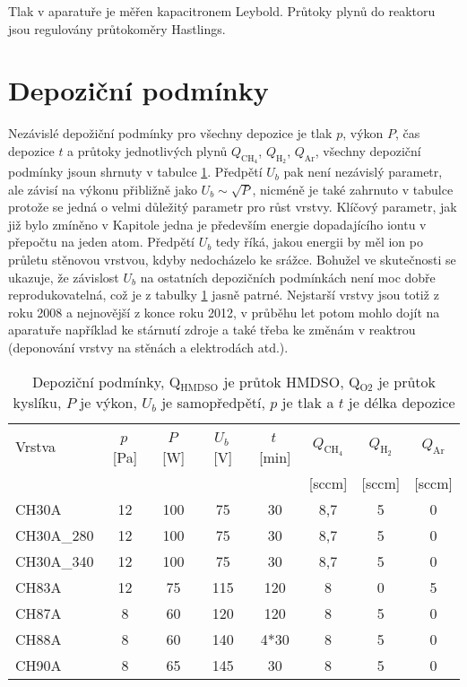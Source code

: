 Tlak v aparatuře je měřen kapacitronem Leybold. Průtoky plynů do reaktoru jsou regulovány průtokoměry Hastlings. 

\section{Depoziční podmínky}

Nezávislé depožiční podmínky pro všechny depozice je tlak $p$, výkon $P$, čas depozice $t$ a průtoky jednotlivých plynů $Q_{\mathrm{CH_4}}$, $Q_{\mathrm{H_2}}$, $Q_{\mathrm{Ar}}$, všechny depoziční podmínky jsoun shrnuty v tabulce \ref{deppodminky}. Předpětí $U_b$ pak není nezávislý parametr, ale závisí na výkonu přibližně jako $U_b \sim \sqrt{P}$, nicméně je také zahrnuto v tabulce protože se jedná o velmi důležitý parametr pro růst vrstvy. Klíčový parametr, jak již bylo zmíněno v Kapitole jedna je především energie dopadajícího iontu v přepočtu na jeden atom. Předpětí $U_b$ tedy říká, jakou energii by měl ion po průletu stěnovou vrstvou, kdyby nedocházelo ke srážce. Bohužel ve skutečnosti se ukazuje, že závislost $U_b$ na ostatních depozičních podmínkách není moc dobře reprodukovatelná, což je z tabulky \ref{deppodminky} jasně patrné. Nejstarší vrstvy jsou totiž z roku 2008 a nejnovější z konce roku 2012, v průběhu let potom mohlo dojít na aparatuře například ke stárnutí zdroje a také třeba ke změnám v reaktrou (deponování vrstvy na stěnách a elektrodách atd.). 

\begin{table}[htbp]
 \centering
 \begin{tabular}{lccccccc}
	\hline
	{Vrstva} & {$p$\,[Pa]} & {$P$\,[W]} & {$U_b$\,[V]} & {$t$\,[min]} & {$Q_{\mathrm{CH_4}}$} & {$Q_\mathrm{H_2}$} & {$Q_\mathrm{Ar}$} \\
	& & & & & {[sccm]} & {[sccm]} & {[sccm]} \\
	\hline\hline
	CH30A     & 12 & 100 & 75  & 30   & 8,7 & 5 & 0 \\
	CH30A\_280 & 12 & 100 & 75  & 30   & 8,7 & 5 & 0 \\
	CH30A\_340 & 12 & 100 & 75  & 30   & 8,7 & 5 & 0 \\
	CH83A     & 12 & 75  & 115 & 120  & 8   & 0 & 5 \\
	CH87A     & 8  & 60  & 120 & 120  & 8   & 5 & 0 \\
	CH88A     & 8  & 60  & 140 & 4*30 & 8   & 5 & 0	\\
	CH90A     & 8  & 65  & 145 & 30   & 8   & 5 & 0 \\
	\hline
 \end{tabular}
 \caption{Depoziční podmínky, Q$_\mathrm{{HMDSO}}$ je průtok HMDSO, Q$_\mathrm{O2}$ je průtok kyslíku, $P$ je výkon, $U_b$ je samopředpětí, $p$ je tlak a $t$ je délka depozice}
\label{deppodminky}
\end{table}

